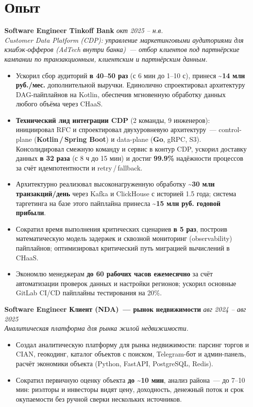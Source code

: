 \documentclass[10pt,a4paper]{article}
\begin{document}
\section*{Опыт}

\textbf{Software Engineer \textbar{} Tinkoff Bank} \hfill \textit{окт 2025 -- н.в.}\\[0.18em]
{\footnotesize\textit{Customer Data Platform (CDP): управление маркетинговыми аудиториями для кэшбэк-офферов (AdTech внутри банка)~--- отбор клиентов под партнёрские кампании по транзакционным, клиентским и партнёрским данным.}}
\begin{itemize}
  \item Ускорил сбор аудиторий \textbf{в 40--50 раз} (с 6 мин до 1--10 с), принеся \textbf{\textasciitilde14 млн руб./мес.} дополнительной выручки. Единолично спроектировал архитектуру DAG-пайплайнов на Kotlin, обеспечив мгновенную обработку данных любого объёма через CHaaS.
  \item \textbf{Технический лид интеграции CDP} (2 команды, 9 инженеров): инициировал RFC и спроектировал двухуровневую архитектуру~--- control-plane (\textbf{Kotlin\,/\,Spring Boot}) и data-plane (\textbf{Go}, gRPC, S3). Консолидировал смежную команду и сервис в контур CDP, ускорил доставку данных \textbf{в 32 раза} (с 8 ч до 15 мин) и достиг \textbf{99.9\%} надёжности процессов за счёт идемпотентности и retry\,/\,fallback.
  \item Архитектурно реализовал высоконагруженную обработку \textbf{\textasciitilde30 млн транзакций/день} через Kafka и ClickHouse с историей 1.5 года; система таргетинга на базе этого пайплайна принесла \textbf{\textasciitilde15 млн руб. годовой прибыли}.
  \item Сократил время выполнения критических сценариев \textbf{в 5 раз}, построив математическую модель задержек и сквозной мониторинг (observability) пайплайнов; оптимизировал критический путь миграцией вычислений в CHaaS.
  \item Экономлю менеджерам \textbf{до 60 рабочих часов ежемесячно} за счёт автоматизации проверок данных и настройки регионов; ускорил основные GitLab CI/CD пайплайны тестирования на 20\%.
\end{itemize}

\vspace{0.55em}
\textbf{Software Engineer \textbar{} Клиент (NDA)~--- рынок недвижимости} \hfill \textit{авг 2024 -- авг 2025}\\[0.18em]
{\footnotesize\textit{Аналитическая платформа для рынка жилой недвижимости.}}
\begin{itemize}
  \item Создал аналитическую платформу для рынка недвижимости: парсинг торгов и CIAN, геокодинг, каталог объектов с поиском, Telegram-бот и админ-панель, расчёт экономики объекта (Python, FastAPI, PostgreSQL, Redis).
  \item Сократил первичную оценку объекта \textbf{до \textasciitilde10 мин}, анализ района~--- до 7--10 мин: риэлторы и инвесторы видят цену, доходность, денежный поток и срок окупаемости без ручной сверки нескольких источников.
\end{itemize}
\end{document}
